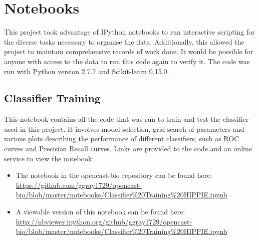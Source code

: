 \appendix
\chapter{Notebooks}

This project took advantage of IPython notebooks to run interactive scripting for the diverse tasks necessary to organise the data.
Additionally, this allowed the project to maintain comprehensive records of work done.
It would be possible for anyone with access to the data to run this code again to verify it.
The code was run with Python version 2.7.7 and Scikit-learn 0.15.0.

\section{Classifier Training}
\label{app:classtrain}

This notebook contains all the code that was run to train and test the classifier used in this project.
It involves model selection, grid search of parameters and various plots describing the performance of different classifiers, such as ROC curves and Precision Recall curves.
Links are provided to the code and an online service to view the notebook:

\begin{itemize}
    \item The notebook in the opencast-bio repository can be found here: \url{https://github.com/ggray1729/opencast-bio/blob/master/notebooks/Classifier%20Training%20HIPPIE.ipynb}
    \item A viewable version of this notebook can be found here: \url{http://nbviewer.ipython.org/github/ggray1729/opencast-bio/blob/master/notebooks/Classifier%20Training%20HIPPIE.ipynb}
\end{itemize}







